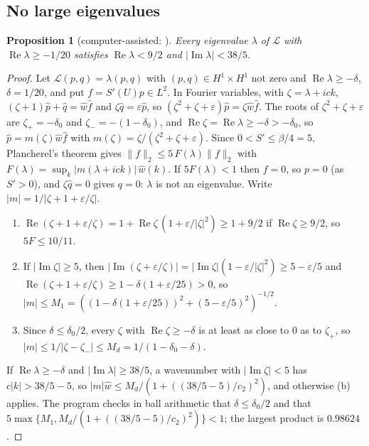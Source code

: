 \documentclass[11pt]{article}
\newtheorem{proposition}[lemma]{Proposition}
\theoremstyle{definition}
\newcommand{\eps}{\varepsilon}
\newcommand{\re}{\operatorname{Re}}
\newcommand{\im}{\operatorname{Im}}
\newcommand{\Lop}{\mathcal{L}}
\newcommand{\dz}{\delta_0}
\begin{document}
\subsection{No large eigenvalues}

\begin{proposition}[computer-assisted: ]\label{prop:large}
Every eigenvalue $\lambda$ of $\Lop$ with $\re\lambda \ge -1/20$ satisfies $\re\lambda < 9/2$ and $|\im\lambda| < 38/5$.
\end{proposition}

\begin{proof}
Let $\Lop(p, q) = \lambda(p, q)$ with $(p, q) \in H^1 \times H^1$ not zero and $\re\lambda \ge -\delta$, $\delta = 1/20$, and put $f = S'(U)p \in L^2$. In Fourier variables, with $\zeta = \lambda + ick$, $(\zeta + 1)\hat p + \hat q = \hat w\hat f$ and $\zeta\hat q = \eps\hat p$, so $(\zeta^2 + \zeta + \eps)\hat p = \zeta\hat w\hat f$. The roots of $\zeta^2 + \zeta + \eps$ are $\zeta_+ = -\dz$ and $\zeta_- = -(1 - \dz)$, and $\re\zeta = \re\lambda \ge -\delta > -\dz$, so $\hat p = m(\zeta)\hat w\hat f$ with $m(\zeta) = \zeta/(\zeta^2 + \zeta + \eps)$. Since $0 < S' \le \beta/4 = 5$, Plancherel's theorem gives $\|f\|_2 \le 5\,F(\lambda)\|f\|_2$ with $F(\lambda) = \sup_k|m(\lambda + ick)|\,\hat w(k)$. If $5F(\lambda) < 1$ then $f = 0$, so $p = 0$ (as $S' > 0$), and $\zeta\hat q = 0$ gives $q = 0$: $\lambda$ is not an eigenvalue. Write $|m| = 1/|\zeta + 1 + \eps/\zeta|$.
\begin{enumerate}
\item[(a)] $\re(\zeta + 1 + \eps/\zeta) = 1 + \re\zeta\,(1 + \eps/|\zeta|^2) \ge 1 + 9/2$ if $\re\zeta \ge 9/2$, so $5F \le 10/11$.
\item[(b)] If $|\im\zeta| \ge 5$, then $|\im(\zeta + \eps/\zeta)| = |\im\zeta|(1 - \eps/|\zeta|^2) \ge 5 - \eps/5$ and $\re(\zeta + 1 + \eps/\zeta) \ge 1 - \delta(1 + \eps/25) > 0$, so $|m| \le M_1 = ((1 - \delta(1 + \eps/25))^2 + (5 - \eps/5)^2)^{-1/2}$.
\item[(c)] Since $\delta \le \dz/2$, every $\zeta$ with $\re\zeta \ge -\delta$ is at least as close to $0$ as to $\zeta_+$, so $|m| \le 1/|\zeta - \zeta_-| \le M_d = 1/(1 - \dz - \delta)$.
\end{enumerate}
If $\re\lambda \ge -\delta$ and $|\im\lambda| \ge 38/5$, a wavenumber with $|\im\zeta| < 5$ has $c|k| > 38/5 - 5$, so $|m|\hat w \le M_d/(1 + ((38/5 - 5)/c_2)^2)$, and otherwise (b) applies. The program checks in ball arithmetic that $\delta \le \dz/2$ and that $5\max\{M_1, M_d/(1 + ((38/5 - 5)/c_2)^2)\} < 1$; the largest product is $0.98624$.
\end{proof}
\end{document}
